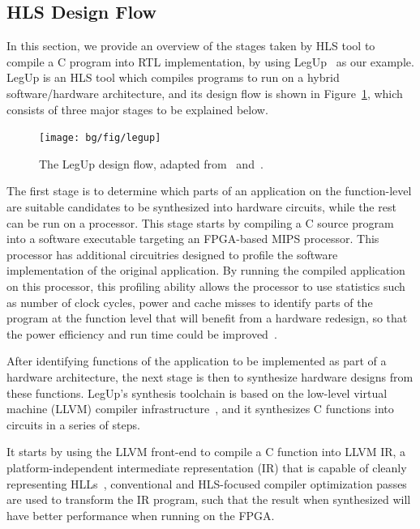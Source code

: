 \subsection{HLS Design Flow}
\label{bg:sub:hls_design}

In this section, we provide an overview of the stages taken by HLS tool to
compile a C program into RTL implementation, by using LegUp~\cite{legup,
canis13} as our example.  LegUp is an HLS tool which compiles programs to run
on a hybrid software/hardware architecture, and its design flow is shown in
Figure~\ref{bg:fig:legup}, which consists of three major stages to be explained
below.
\begin{figure}[ht]
    \centering
    \texttt{[image: bg/fig/legup]}
    \caption{%
        The LegUp design flow, adapted from~\cite{canis13} and~\cite{legup}.
    }\label{bg:fig:legup}
\end{figure}

The first stage is to determine which parts of an application on the
function-level are suitable candidates to be synthesized into hardware
circuits, while the rest can be run on a processor.  This stage starts by
compiling a C source program into a software executable targeting an FPGA-based
MIPS processor.  This processor has additional circuitries designed to profile
the software implementation of the original application.  By running the
compiled application on this processor, this profiling ability allows the
processor to use statistics such as number of clock cycles, power and cache
misses to identify parts of the program at the function level that will benefit
from a hardware redesign, so that the power efficiency and run time could be
improved~\cite{canis13}.

After identifying functions of the application to be implemented as part
of a hardware architecture, the next stage is then to synthesize hardware
designs from these functions.  LegUp's synthesis toolchain is based on the
low-level virtual machine (LLVM) compiler infrastructure~\cite{llvm}, and it
synthesizes C functions into circuits in a series of steps.

It starts by using the LLVM front-end to compile a C function into LLVM IR,
a platform-independent intermediate representation (IR) that is capable of
cleanly representing HLLs~\cite{llvm_ir}, conventional and HLS-focused compiler
optimization passes are used to transform the IR program, such that the result
when synthesized will have better performance when running on the FPGA\@.

